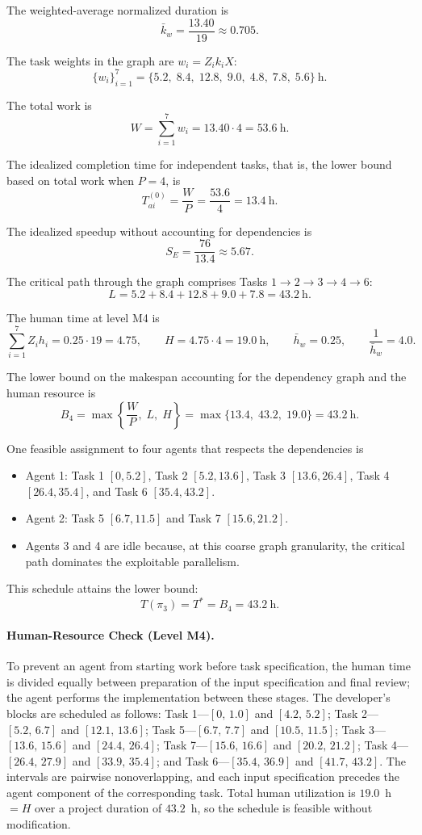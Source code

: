 The weighted-average normalized duration is
\[
  \bar{k}_w = \frac{13.40}{19} \approx 0.705.
\]

The task weights in the graph are $w_i = Z_i k_i X$:
\[
  \{w_i\}_{i=1}^{7} = \{5.2,\; 8.4,\; 12.8,\; 9.0,\; 4.8,\; 7.8,\; 5.6\}~\text{h}.
\]

The total work is
\[
  W = \sum_{i=1}^{7} w_i = 13.40 \cdot 4 = 53.6~\text{h}.
\]

The idealized completion time for independent tasks, that is, the lower bound
based on total work when $P = 4$, is
\[
  T_{ai}^{(0)} = \frac{W}{P} = \frac{53.6}{4} = 13.4~\text{h}.
\]

The idealized speedup without accounting for dependencies is
\[
  S_E = \frac{76}{13.4} \approx 5.67.
\]

The critical path through the graph comprises Tasks
$1 \to 2 \to 3 \to 4 \to 6$:
\[
  L = 5.2 + 8.4 + 12.8 + 9.0 + 7.8 = 43.2~\text{h}.
\]

The human time at level M4 is
\[
  \sum_{i=1}^{7} Z_i h_i = 0.25 \cdot 19 = 4.75,
  \qquad
  H = 4.75 \cdot 4 = 19.0~\text{h},
  \qquad
  \bar{h}_w = 0.25,
  \qquad
  \frac{1}{\bar{h}_w} = 4.0.
\]

The lower bound on the makespan accounting for the dependency graph and the
human resource is
\[
  B_4 = \max\left\{\frac{W}{P},\; L,\; H\right\} = \max\{13.4,\; 43.2,\; 19.0\} = 43.2~\text{h}.
\]

One feasible assignment to four agents that respects the dependencies is
\begin{itemize}
  \item Agent 1: Task 1 $[0,5.2]$, Task 2 $[5.2,13.6]$, Task 3
  $[13.6,26.4]$, Task 4 $[26.4,35.4]$, and Task 6 $[35.4,43.2]$.
  \item Agent 2: Task 5 $[6.7,11.5]$ and Task 7 $[15.6,21.2]$.
  \item Agents 3 and 4 are idle because, at this coarse graph granularity, the
  critical path dominates the exploitable parallelism.
\end{itemize}

This schedule attains the lower bound:
\[
  T(\pi_3)=T^{*}=B_4=43.2~\text{h}.
\]

\paragraph{Human-Resource Check (Level M4).}
To prevent an agent from starting work before task specification, the human
time is divided equally between preparation of the input specification and
final review; the agent performs the implementation between these stages. The
developer's blocks are scheduled as follows: Task 1---$[0,\,1.0]$ and
$[4.2,\,5.2]$; Task 2---$[5.2,\,6.7]$ and $[12.1,\,13.6]$; Task
5---$[6.7,\,7.7]$ and $[10.5,\,11.5]$; Task 3---$[13.6,\,15.6]$ and
$[24.4,\,26.4]$; Task 7---$[15.6,\,16.6]$ and $[20.2,\,21.2]$; Task
4---$[26.4,\,27.9]$ and $[33.9,\,35.4]$; and Task 6---$[35.4,\,36.9]$
and $[41.7,\,43.2]$. The intervals are pairwise nonoverlapping, and each input
specification precedes the agent component of the corresponding task. Total
human utilization is $19.0$~h $= H$ over a project duration of $43.2$~h, so the
schedule is feasible without modification.

